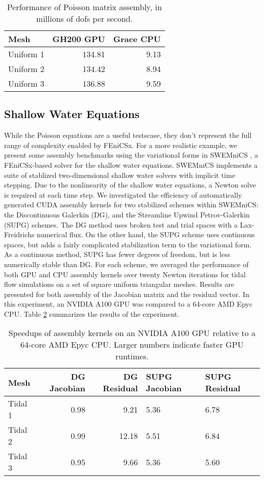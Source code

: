 \begin{table}[t]
    \centering
\begin{tabular}{lrr}
\toprule
Mesh & GH200 GPU & Grace CPU \\
\midrule
Uniform 1 & 134.81 & 9.13 \\ 
Uniform 2 & 134.42 & 8.94 \\ 
Uniform 3 & 136.88 & 9.59 \\ 
\bottomrule
\end{tabular}
\caption{Performance of Poisson matrix assembly, in millions of dofs per second.}
    \label{tab:poisson_results}
\end{table}

\subsection*{Shallow Water Equations}

While the Poisson equations are a useful testscase, they don't represent the full range of complexity enabled by FEniCSx. For a more realistic example, we present some assembly benchmarks using the variational forms in SWEMniCS \cite{dawson2024swemnics}, a FEniCSx-based solver for the shallow water equations. SWEMniCS implements a suite of stablized two-dimensional shallow water solvers with implicit time stepping. Due to the nonlinearity of the shallow water equations, a Newton solve is required at each time step. We investigated the efficiency of automatically generated CUDA assembly kernels for two stabilized schemes within SWEMniCS: the Discontinuous Galerkin (DG), and the Streamline Upwind Petrov-Galerkin (SUPG) schemes. The DG method uses broken test and trial spaces with a Lax-Freidrichs numerical flux. On the other hand, the SUPG scheme uses continuous spaces, but adds a fairly complicated stabilization term to the variational form. As a continuous method, SUPG has fewer degrees of freedom, but is less numerically stable than DG. For each scheme, we averaged the performance of both GPU and CPU assembly kernels over twenty Newton iterations for tidal flow simulations on a set of square uniform triangular meshes. Results are presented for both assembly of the Jacobian matrix and the residual vector. In this experiment, an NVIDIA A100 GPU was compared to a 64-core AMD Epyc CPU.
Table \ref{tab:swe_a100_vs_epyc} summarizes the results of the experiment.
\begin{table}[t]
    \centering
    \begin{tabular}{lrrll}
\toprule
Mesh & DG Jacobian & DG Residual & SUPG Jacobian & SUPG Residual \\
\midrule
Tidal 1 & 0.98 & 9.21 & 5.36 & 6.78 \\
Tidal 2 & 0.99 & 12.18 & 5.51 & 6.84 \\
Tidal 3 & 0.95 & 9.66 & 5.36 & 5.60 \\
\bottomrule
\end{tabular}
    \caption{Speedups of assembly kernels on an NVIDIA A100 GPU relative to a 64-core AMD Epyc CPU. Larger numbers indicate faster GPU runtimes.}
    \label{tab:swe_a100_vs_epyc}
\end{table}

